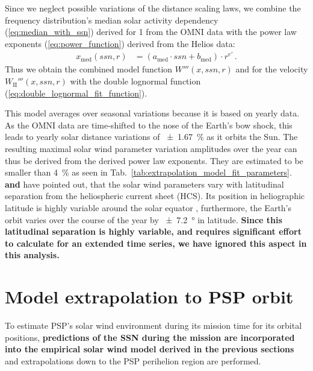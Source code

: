 Since we neglect possible variations of the distance scaling laws, we combine the frequency distribution’s median solar activity dependency (\ref{eq:median_with_ssn}) derived for \SI{1}{\au} from the OMNI data with the power law exponents (\ref{eq:power_function}) derived from the Helios data:
\begin{align}
	x_\text{med}(ssn,r) &= (a_\text{med} \cdot ssn + b_\text{med}) \cdot r^{e'}	\,.	\label{eq:general_sw_model}
\end{align}
Thus we obtain the combined model function $W'''(x,ssn,r)$ and for the velocity $W_\text{II}'''(x,ssn,r)$ with the double lognormal function (\ref{eq:double_lognormal_fit_function}).

This model averages over seasonal variations because it is based on yearly data. As the OMNI data are time-shifted to the nose of the Earth’s bow shock, this leads to yearly solar distance variations of \SI{+-1.67}{\%} as it orbits the Sun. The resulting maximal solar wind parameter variation amplitudes over the year can thus be derived from the derived power law exponents. They are estimated to be smaller than \SI{4}{\percent} as seen in Tab.~\ref{tab:extrapolation_model_fit_parameters}. \citet{Bruno1986} \textbf{and} \citet{Balogh1999} have pointed out, that the solar wind parameters vary with latitudinal separation from the heliospheric current sheet (HCS). Its position in heliographic latitude is highly variable around the solar equator \citep{Schwenn1990}, furthermore, the Earth’s orbit varies over the course of the year by \SI{+-7.2}{\degree} in latitude. \textbf{Since this latitudinal separation is highly variable, and requires significant effort to calculate for an extended time series, we have ignored this aspect in this analysis.}	%


\section{Model extrapolation to PSP orbit}
\label{sec:model_extrapolation_to_psp_orbit}
To estimate PSP’s solar wind environment during its mission time for its orbital positions, \textbf{predictions of the SSN during the mission are incorporated into the empirical solar wind model derived in the previous sections} and extrapolations down to the PSP perihelion region are performed.

